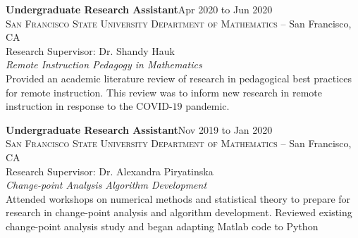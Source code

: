 \documentclass[hidelinks, 10pt]{article}
\def\contentblockspacing{2.5mm}     %
\begin{document}
\vspace{\contentblockspacing}\vspace{1mm}

\begin{minipage}[ct]{0.9\linewidth}
    \textbf{Undergraduate Research Assistant}\hfill Apr 2020 to Jun 2020\\
    \textsc{San Francisco State University Department of Mathematics} -- San Francisco, CA\\
    Research Supervisor: Dr. Shandy Hauk\vspace{1mm}\\
    {\textit{Remote Instruction Pedagogy in Mathematics}}\\
    Provided an academic literature review of research in pedagogical best practices
    for remote instruction.  This review was to inform new research in remote
    instruction in response to the COVID-$19$ pandemic.
\end{minipage}

\vspace{\contentblockspacing}
\begin{minipage}[ct]{0.9\linewidth}
    \textbf{Undergraduate Research Assistant}\hfill Nov 2019 to Jan 2020\\
    \textsc{San Francisco State University Department of Mathematics} -- San Francisco, CA\\
    Research Supervisor: Dr. Alexandra Piryatinska\vspace{1mm}\\
    {\textit{Change-point Analysis Algorithm Development}}\\
    Attended workshops on numerical methods and statistical theory to prepare for research in change-point analysis and algorithm
    development. Reviewed existing change-point analysis study and began adapting Matlab code to Python
\end{minipage}
\end{document}
